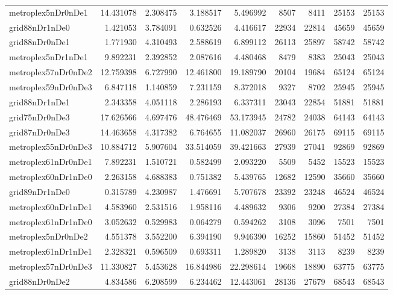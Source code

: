 \begin{longtable}{|l|r|r|r|r|r|r|r|r|}
metroplex5nDr0nDe1 & 14.431078 & 2.308475 & 3.188517 & 5.496992 & 8507 & 8411 & 25153 & 25153 \\
grid88nDr1nDe0 & 1.421053 & 3.784091 & 0.632526 & 4.416617 & 22934 & 22814 & 45659 & 45659 \\
grid88nDr0nDe1 & 1.771930 & 4.310493 & 2.588619 & 6.899112 & 26113 & 25897 & 58742 & 58742 \\
metroplex5nDr1nDe1 & 9.892231 & 2.392852 & 2.087616 & 4.480468 & 8479 & 8383 & 25043 & 25043 \\
metroplex57nDr0nDe2 & 12.759398 & 6.727990 & 12.461800 & 19.189790 & 20104 & 19684 & 65124 & 65124 \\
metroplex59nDr0nDe3 & 6.847118 & 1.140859 & 7.231159 & 8.372018 & 9327 & 8702 & 25945 & 25945 \\
grid88nDr1nDe1 & 2.343358 & 4.051118 & 2.286193 & 6.337311 & 23043 & 22854 & 51881 & 51881 \\
grid75nDr0nDe3 & 17.626566 & 4.697476 & 48.476469 & 53.173945 & 24782 & 24038 & 64143 & 64143 \\
grid87nDr0nDe3 & 14.463658 & 4.317382 & 6.764655 & 11.082037 & 26960 & 26175 & 69115 & 69115 \\
metroplex55nDr0nDe3 & 10.884712 & 5.907604 & 33.514059 & 39.421663 & 27939 & 27041 & 92869 & 92869 \\
metroplex61nDr0nDe1 & 7.892231 & 1.510721 & 0.582499 & 2.093220 & 5509 & 5452 & 15523 & 15523 \\
metroplex60nDr1nDe0 & 2.263158 & 4.688383 & 0.751382 & 5.439765 & 12682 & 12590 & 35660 & 35660 \\
grid89nDr1nDe0 & 0.315789 & 4.230987 & 1.476691 & 5.707678 & 23392 & 23248 & 46524 & 46524 \\
metroplex60nDr1nDe1 & 4.583960 & 2.531516 & 1.958116 & 4.489632 & 9306 & 9200 & 27384 & 27384 \\
metroplex61nDr1nDe0 & 3.052632 & 0.529983 & 0.064279 & 0.594262 & 3108 & 3096 & 7501 & 7501 \\
metroplex5nDr0nDe2 & 4.551378 & 3.552200 & 6.394190 & 9.946390 & 16252 & 15860 & 51452 & 51452 \\
metroplex61nDr1nDe1 & 2.328321 & 0.596509 & 0.693311 & 1.289820 & 3138 & 3113 & 8239 & 8239 \\
metroplex57nDr0nDe3 & 11.330827 & 5.453628 & 16.844986 & 22.298614 & 19668 & 18890 & 63775 & 63775 \\
grid88nDr0nDe2 & 4.834586 & 6.208599 & 6.234462 & 12.443061 & 28136 & 27679 & 68543 & 68543 \\

\end{longtable}
